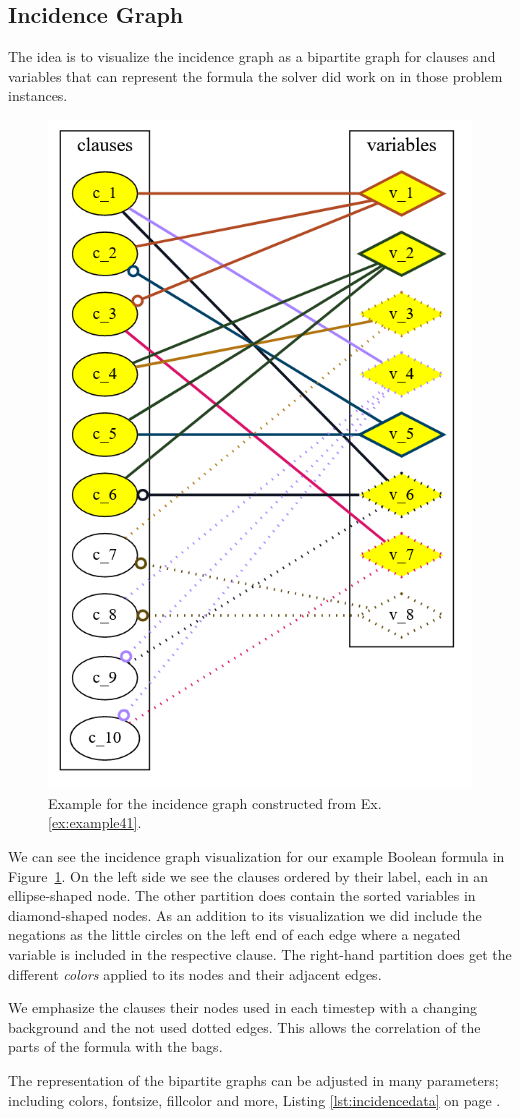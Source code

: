 \documentclass[a4paper, 12pt, bibliography=totoc]{scrartcl}
\begin{document}
\subsection{Incidence Graph}\label{sec:incid}

The idea is to visualize the incidence graph as a bipartite graph for clauses and variables that can represent the formula the solver did work on in those problem instances.

\begin{figure}[H]
	\centering
	\includegraphics[width=0.4\linewidth]{images/IncidenceStep6.png}
	\caption{Example for the incidence graph constructed from Ex. \ref{ex:example41}.}
	\label{fig:incidencestep6}
\end{figure}

 We can see the incidence graph visualization for our example Boolean formula in Figure~\ref{fig:incidencestep6}. On the left side we see the clauses ordered by their label, each in an ellipse-shaped node. The other partition does contain the sorted variables in diamond-shaped nodes. As an addition to its visualization we did include the negations as the little circles on the left end of each edge where a negated variable is included in the respective clause. The right-hand partition does get the different \textit{colors} applied to its nodes and their adjacent edges.
 
 We emphasize the clauses their nodes used in each timestep with a changing background and the not used dotted edges. This allows the correlation of the  parts of the formula with the bags.  

The representation of the bipartite graphs can be adjusted in many parameters; including colors, fontsize, fillcolor and more, Listing \ref{lst:incidencedata} on page \pageref{lst:incidencedata}.
\end{document}
